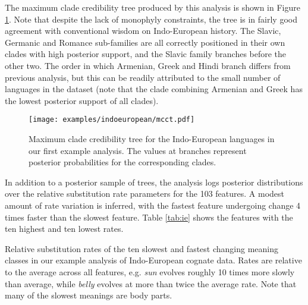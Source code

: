 \documentclass[twocolumn,10pt]{scrartcl}
\begin{document}
The maximum clade credibility tree produced by this analysis is shown in Figure \ref{fig:ie}.  Note that despite the lack of monophyly constraints, the tree is in fairly good agreement with conventional wisdom on Indo-European history.  The Slavic, Germanic and Romance sub-families are all correctly positioned in their own clades with high posterior support, and the Slavic family branches before the other two.  The order in which Armenian, Greek and Hindi branch differs from previous analysis\cite{Gray2003,Bouckaert2012}, but this can be readily attributed to the small number of languages in the dataset (note that the clade combining Armenian and Greek has the lowest posterior support of all clades).

\begin{figure}[t]
	\begin{center}
	\texttt{[image: examples/indoeuropean/mcct.pdf]}
	\end{center}
	\caption{Maximum clade credibility tree for the Indo-European languages in our first example analysis.  The values at branches represent posterior probabilities for the corresponding clades.}
\label{fig:ie}
\end{figure}

In addition to a posterior sample of trees, the analysis logs posterior distributions over the relative substitution rate parameters for the 103 features.  A modest amount of rate variation is inferred, with the fastest feature undergoing change 4 times faster than the slowest feature.  Table \ref{tab:ie} shows the features with the ten highest and ten lowest rates.  
\begin{table}[t]
	\begin{center}
		
	\end{center}
	\caption{Relative substitution rates of the ten slowest and fastest changing meaning classes in our example analysis of Indo-European cognate data.  Rates are relative to the average across all features, e.g. \emph{sun} evolves roughly 10 times more slowly than average, while \emph{belly} evolves at more than twice the average rate.  Note that many of the slowest meanings are body parts.}
\label{tab:ie}
\end{table}
\end{document}
